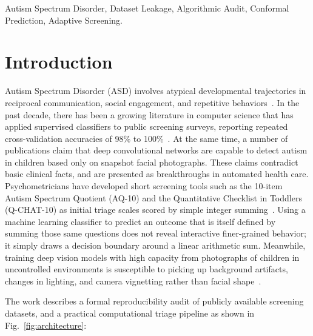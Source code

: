 \documentclass[conference]{IEEEtran}
\begin{document}
\begin{IEEEkeywords}
Autism Spectrum Disorder, Dataset Leakage, Algorithmic Audit, Conformal Prediction, Adaptive Screening.
\end{IEEEkeywords}

\section{Introduction}

Autism Spectrum Disorder (ASD) involves atypical developmental trajectories in reciprocal communication, social engagement, and repetitive behaviors~\cite{american2013diagnostic}. In the past decade, there has been a growing literature in computer science that has applied supervised classifiers to public screening surveys, reporting repeated cross-validation accuracies of 98\% to 100\%~\cite{thabtah2019machine}. At the same time, a number of publications claim that deep convolutional networks are capable to detect autism in children based only on snapshot facial photographs. These claims contradict basic clinical facts, and are presented as breakthroughs in automated health care. Psychometricians have developed short screening tools such as the 10-item Autism Spectrum Quotient (AQ-10) and the Quantitative Checklist in Toddlers (Q-CHAT-10) as initial triage scales scored by simple integer summing~\cite{allison2012toward}. Using a machine learning classifier to predict an outcome that is itself defined by summing those same questions does not reveal interactive finer-grained behavior; it simply draws a decision boundary around a linear arithmetic sum. Meanwhile, training deep vision models with high capacity from photographs of children in uncontrolled environments is susceptible to picking up background artifacts, changes in lighting, and camera vignetting rather than facial shape~\cite{geirhos2020shortcut}.

The work describes a formal reproducibility audit of publicly available screening datasets, and a practical computational triage pipeline as shown in Fig.~\ref{fig:architecture}:
\end{document}
